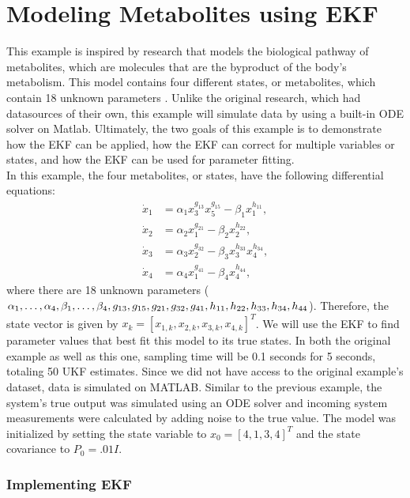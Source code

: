 \section{Modeling Metabolites using EKF}
\label{Modeling Metabolites using EKF}

\noindent This example is inspired by research that models the biological pathway of metabolites, which are molecules that are the byproduct of the body's metabolism. This model contains four different states, or metabolites, which contain 18 unknown parameters \cite{article5}. Unlike the original research, which had datasources of their own, this example will simulate data by using a built-in ODE solver on Matlab. Ultimately, the two goals of this example is to demonstrate how the EKF can be applied, how the EKF can correct for multiple variables or states, and how the EKF can be used for parameter fitting. \\ 

\noindent In this example, the four metabolites, or states, have the following differential equations:
\begin{align*}
\dot x_1 &= \alpha_1 x_3^{g_{13}} x_5^{g_{15}} - \beta_1 x_1^{h_{11}}, \\
\dot x_2 &= \alpha_2 x_1^{g_{21}} - \beta_2 x_2^{h_{22}}, \\
\dot x_3 &= \alpha_3 x_2^{g_{32}} - \beta_3 x_3^{h_{33}} x_4^{h_{34}}, \\
\dot x_4 &= \alpha_4  x_1^{g_{41}} - \beta_4 x_4^{h_{44}},
\end{align*}
where there are 18 unknown parameters ($\alpha_1, \hdots, \alpha_4, \beta_1, \hdots, \beta_4, g_{13}, g_{15}, g_{21}, \\ g_{32}, g_{41}, h_{11}, h_{22}, h_{33}, h_{34}, h_{44} $). Therefore, the state vector is given by $x_k = [x_{1,k}, x_{2,k}, x_{3,k}, x_{4,k}]^T$. We will use the EKF to find parameter values that best fit this model to its true states. In both the original example as well as this one, sampling time will be 0.1 seconds for 5 seconds, totaling 50 UKF estimates. Since we did not have access to the original example's dataset, data is simulated on MATLAB. Similar to the previous example, the system's true output was simulated using an ODE solver and incoming system measurements were calculated by adding noise to the true value. The model was initialized by setting the state variable to $x_0 = [4, 1, 3, 4]^T$ and the state covariance to $P_0 = .01I$. 

\subsubsection{Implementing EKF}

